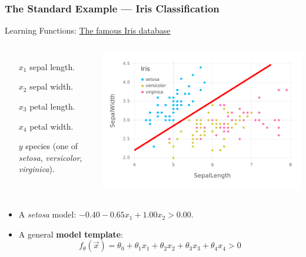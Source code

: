 \documentclass[bigger]{beamer}
\begin{document}
\begin{frame}
    \frametitle{The Standard Example --- Iris Classification}
    \small
    \begin{center}
        Learning Functions: \href{https://en.wikipedia.org/wiki/Iris_flower_data_set}{The famous Iris database}
    \end{center}
    \begin{columns}
        \begin{itemize}\setlength{\itemsep}{-0.5em}
            \item[$x_1$] sepal length.
            \item[$x_2$] sepal width.
            \item[$x_3$] petal length.
            \item[$x_4$] petal width.
            \item[$y$] species (one of \emph{setosa}, \emph{versicolor}, \emph{virginica}).
        \end{itemize}
        \begin{center}
            \includegraphics[width=\textwidth]{iris_plot.pdf}
        \end{center}
    \end{columns}
    \vfill
    \begin{itemize}
        \item A \emph{setosa} model: $ - 0.40 -0.65x_1 + 1.00x_2  > 0.00$.
        \item A general \textbf{model template}:
              $$
                  f_\theta(\vec{x}) = \theta_0 + \theta_1 x_1 + \theta_2 x_2 + \theta_3 x_3 + \theta_4 x_4> 0
              $$
    \end{itemize}
\end{frame}
\end{document}
